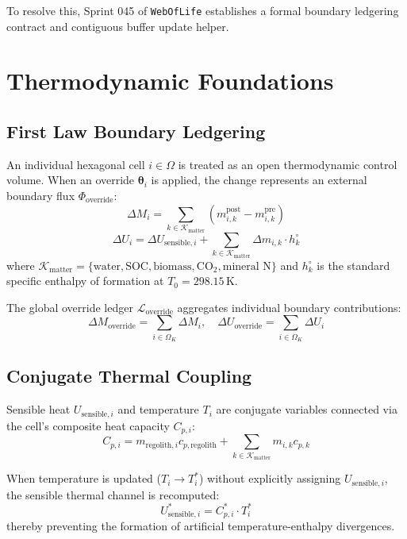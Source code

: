 \documentclass[twocolumn,10pt]{article}
\begin{document}
To resolve this, Sprint 045 of \texttt{WebOfLife} establishes a formal boundary ledgering contract and contiguous buffer update helper.

\section{Thermodynamic Foundations}

\subsection{First Law Boundary Ledgering}
An individual hexagonal cell $i \in \Omega$ is treated as an open thermodynamic control volume. When an override $\mathbf{\theta}_i$ is applied, the change represents an external boundary flux $\Phi_{\text{override}}$:
\begin{equation}
\Delta M_i = \sum_{k \in \mathcal{K}_{\text{matter}}} \left( m_{i,k}^{\text{post}} - m_{i,k}^{\text{pre}} \right)
\end{equation}
\begin{equation}
\Delta U_i = \Delta U_{\text{sensible}, i} + \sum_{k \in \mathcal{K}_{\text{matter}}} \Delta m_{i,k} \cdot h_{k}^{\circ}
\end{equation}
where $\mathcal{K}_{\text{matter}} = \{\text{water}, \text{SOC}, \text{biomass}, \text{CO}_2, \text{mineral N}\}$ and $h_k^\circ$ is the standard specific enthalpy of formation at $T_0 = 298.15\,\text{K}$.

The global override ledger $\mathcal{L}_{\text{override}}$ aggregates individual boundary contributions:
\begin{equation}
\Delta M_{\text{override}} = \sum_{i \in \Omega_K} \Delta M_i, \quad \Delta U_{\text{override}} = \sum_{i \in \Omega_K} \Delta U_i
\end{equation}

\subsection{Conjugate Thermal Coupling}
Sensible heat $U_{\text{sensible}, i}$ and temperature $T_i$ are conjugate variables connected via the cell's composite heat capacity $C_{p,i}$:
\begin{equation}
C_{p,i} = m_{\text{regolith}, i} c_{p,\text{regolith}} + \sum_{k \in \mathcal{K}_{\text{matter}}} m_{i,k} c_{p,k}
\end{equation}

When temperature is updated ($T_i \to T_i^*$) without explicitly assigning $U_{\text{sensible}, i}$, the sensible thermal channel is recomputed:
\begin{equation}
U_{\text{sensible}, i}^* = C_{p,i}^* \cdot T_i^*
\end{equation}
thereby preventing the formation of artificial temperature-enthalpy divergences.
\end{document}
